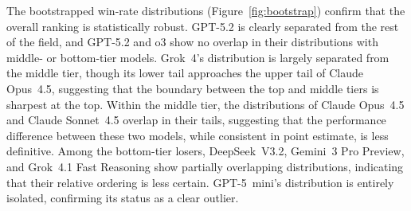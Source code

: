\documentclass{article}
\begin{document}
The bootstrapped win-rate distributions (Figure~\ref{fig:bootstrap}) confirm that the overall ranking is statistically robust. GPT-5.2 is clearly separated from the rest of the field, and GPT-5.2 and o3 show no overlap in their distributions with middle- or bottom-tier models. Grok~4's distribution is largely separated from the middle tier, though its lower tail approaches the upper tail of Claude Opus~4.5, suggesting that the boundary between the top and middle tiers is sharpest at the top. Within the middle tier, the distributions of Claude Opus~4.5 and Claude Sonnet~4.5 overlap in their tails, suggesting that the performance difference between these two models, while consistent in point estimate, is less definitive. Among the bottom-tier losers, DeepSeek~V3.2, Gemini~3 Pro Preview, and Grok~4.1 Fast Reasoning show partially overlapping distributions, indicating that their relative ordering is less certain. GPT-5~mini's distribution is entirely isolated, confirming its status as a clear outlier.

\begin{table}[t]
\centering
\caption{Aggregate poker statistics for all models, sorted by win rate (BB/100). VPIP = voluntarily put money in pot. Att To Steal = button open-raise frequency. Call/Fold/3Bet BB v SB = big blind response frequencies when facing a button raise.}
\label{tab:poker_stats}
\end{table}
\end{document}
